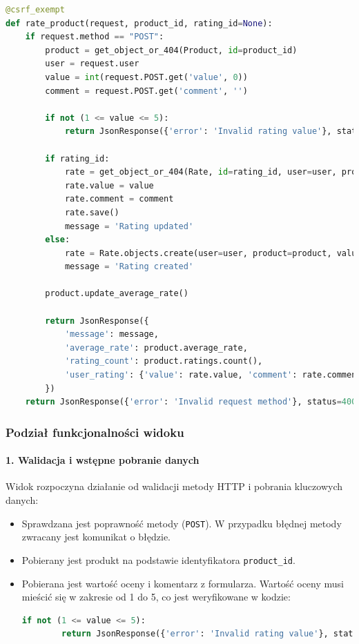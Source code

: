 \documentclass[12pt,a4paper,oneside]{article}
\theoremstyle{definition}
\numberwithin{equation}{section}
\begin{document}
\begin{lstlisting}[language=Python, caption=Widok \texttt{rate\_product}, label=rate_product_view]
@csrf_exempt
def rate_product(request, product_id, rating_id=None):
    if request.method == "POST":
        product = get_object_or_404(Product, id=product_id)
        user = request.user
        value = int(request.POST.get('value', 0))
        comment = request.POST.get('comment', '')

        if not (1 <= value <= 5):
            return JsonResponse({'error': 'Invalid rating value'}, status=400)

        if rating_id:
            rate = get_object_or_404(Rate, id=rating_id, user=user, product=product)
            rate.value = value
            rate.comment = comment
            rate.save()
            message = 'Rating updated'
        else:
            rate = Rate.objects.create(user=user, product=product, value=value, comment=comment)
            message = 'Rating created'

        product.update_average_rate()

        return JsonResponse({
            'message': message,
            'average_rate': product.average_rate,
            'rating_count': product.ratings.count(),
            'user_rating': {'value': rate.value, 'comment': rate.comment}
        })
    return JsonResponse({'error': 'Invalid request method'}, status=400)
\end{lstlisting}

\subsubsection*{Podział funkcjonalności widoku}

\paragraph{1. Walidacja i wstępne pobranie danych}
Widok rozpoczyna działanie od walidacji metody HTTP i pobrania kluczowych danych:
\begin{itemize}
    \item Sprawdzana jest poprawność metody (\texttt{POST}). W przypadku błędnej metody zwracany jest komunikat o błędzie.
    \item Pobierany jest produkt na podstawie identyfikatora \texttt{product\_id}.
    \item Pobierana jest wartość oceny i komentarz z formularza. Wartość oceny musi mieścić się w zakresie od 1 do 5, co jest weryfikowane w kodzie:
    \begin{lstlisting}[language=Python]
    if not (1 <= value <= 5):
        return JsonResponse({'error': 'Invalid rating value'}, status=400)
    \end{lstlisting}
\end{itemize}
\end{document}
